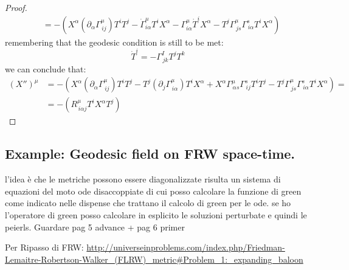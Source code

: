\documentclass[Main]{subfiles}
\begin{document}
\begin{proof}
\begin{align*}
			&=			
			-\left(
			X^\alpha\left(\partial_\alpha\Gamma^{\mu}_{\, i j}\right)T^i T^j - \dot{\Gamma}^\mu_{i \alpha} T^i X^\alpha
			- \Gamma^\mu_{i \alpha} \dot{T}^i X^\alpha  - T^j \Gamma^\mu_{\, j s} \Gamma^s_{\, i \alpha} T^i X^\alpha				
			\right)
		\end{align*}
		remembering that the geodesic condition is still to be met:
		\begin{displaymath}
			\dot{T}^i = - \Gamma^I_{\, j k} T^j T^k
		\end{displaymath}
		we can conclude that:
		\begin{align*}
			\left(X'' \right)^\mu &=
			- \left(
			  X^\alpha\left( \partial_\alpha\Gamma^\mu_{\, i j}\right)T^i T^j
			- T^j \left( \partial_j \Gamma^\mu_{\, i \alpha}\right) T^i X^\alpha
			+X^\alpha \Gamma^\mu_{\, \alpha s} \Gamma^s_{\, i j}T^i T^j 
			- T^j \Gamma^\mu_{\, j s} \Gamma^s_{\, i \alpha} T^i X^\alpha
			\right) =\\
			&=	-\left( R^\mu_{\, i \alpha j}T^i X^\alpha T^j\right)		
		\end{align*}
	\end{proof}
	
	

	
	

\subsection{Example: Geodesic field on FRW space-time.}
	\begin{Warning}
	l'idea è che le metriche possono essere diagonalizzate risulta un sistema di equazioni del moto ode disaccoppiate di cui posso calcolare la funzione di green come indicato nelle dispense che trattano il calcolo di green per le ode.
	se ho l'operatore di green posso calcolare in esplicito le soluzioni perturbate e quindi le peierls.
	Guardare pag 5 advance + pag 6 primer	
	
	Per Ripasso di FRW: \url{http://universeinproblems.com/index.php/Friedman-Lemaitre-Robertson-Walker_(FLRW)_metric#Problem_1:_expanding_baloon}
	\end{Warning}
	
\end{document}
